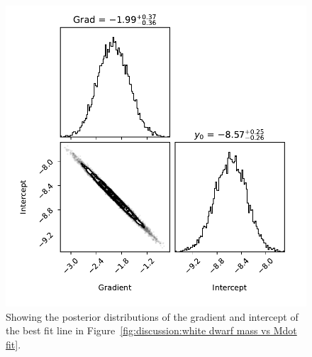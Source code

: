 \begin{figure}
    \centering
    \includegraphics[width=\textwidth]{figures/results/Mdot/Mwd_Mdot_corner.pdf}
    \caption{Showing the posterior distributions of the gradient and intercept of the best fit line in Figure~\ref{fig:discussion:white dwarf mass vs Mdot fit}.}
    \label{fig:discussion:white dwarf mass vs Mdot corner}
\end{figure}


